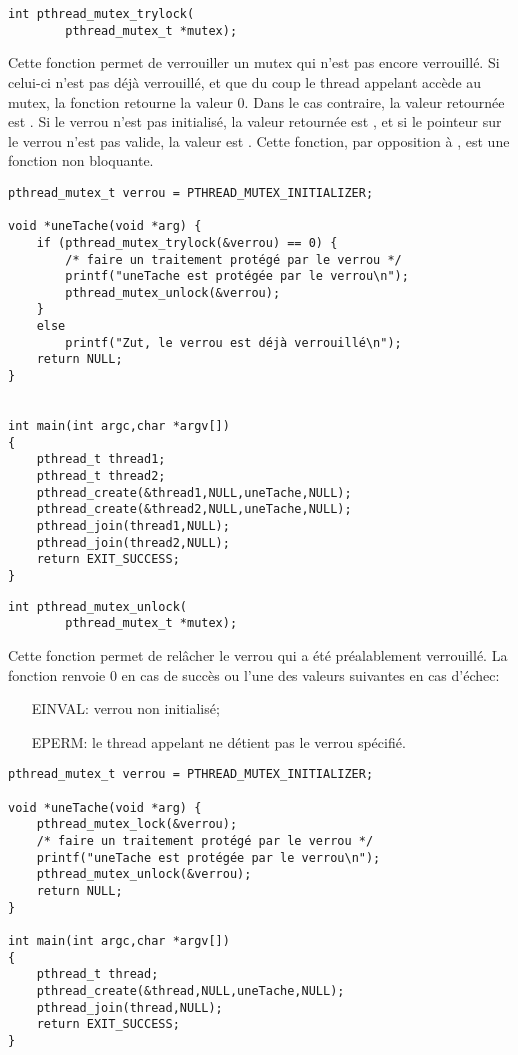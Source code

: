 \label{func:pthread_mutex_trylock}

\begin{lstlisting}
int pthread_mutex_trylock(
		pthread_mutex_t *mutex);
\end{lstlisting}

Cette fonction permet de verrouiller un mutex qui n'est pas encore verrouillé. Si celui-ci n'est pas déjà verrouillé, et que du coup le thread appelant accède au mutex, la fonction retourne la valeur 0. Dans le cas contraire, la valeur retournée est . Si le verrou n'est pas initialisé, la valeur retournée est , et si le pointeur sur le verrou n'est pas valide, la valeur est . Cette fonction, par opposition à , est une fonction non bloquante.

\begin{lstlisting}
pthread_mutex_t verrou = PTHREAD_MUTEX_INITIALIZER;

void *uneTache(void *arg) {
	if (pthread_mutex_trylock(&verrou) == 0) {
		/* faire un traitement protégé par le verrou */
		printf("uneTache est protégée par le verrou\n");
		pthread_mutex_unlock(&verrou);
	}
	else
		printf("Zut, le verrou est déjà verrouillé\n");
	return NULL;
}


int main(int argc,char *argv[])
{
	pthread_t thread1;
	pthread_t thread2;
	pthread_create(&thread1,NULL,uneTache,NULL);
	pthread_create(&thread2,NULL,uneTache,NULL);
	pthread_join(thread1,NULL);
	pthread_join(thread2,NULL);
	return EXIT_SUCCESS;
}
\end{lstlisting}


\label{func:pthread_mutex_unlock}

\begin{lstlisting}
int pthread_mutex_unlock(
		pthread_mutex_t *mutex);
\end{lstlisting}

Cette fonction permet de relâcher le verrou qui a été préalablement verrouillé. La fonction renvoie 0 en cas de succès ou l'une des valeurs suivantes en cas d'échec:
\begin{itemize}
\item[EINVAL:] verrou non initialisé;
\item[EPERM:] le thread appelant ne détient pas le verrou spécifié.
\end{itemize}

\begin{lstlisting}
pthread_mutex_t verrou = PTHREAD_MUTEX_INITIALIZER;

void *uneTache(void *arg) {
	pthread_mutex_lock(&verrou);
	/* faire un traitement protégé par le verrou */
	printf("uneTache est protégée par le verrou\n");
	pthread_mutex_unlock(&verrou);
	return NULL;
}

int main(int argc,char *argv[])
{
	pthread_t thread;
	pthread_create(&thread,NULL,uneTache,NULL);
	pthread_join(thread,NULL);
	return EXIT_SUCCESS;
}
\end{lstlisting}

